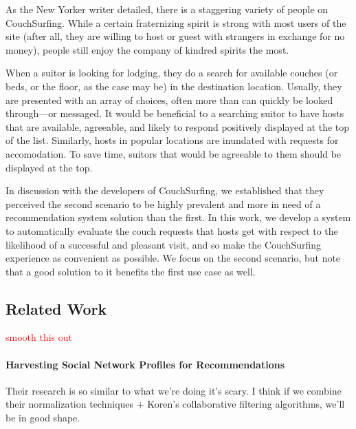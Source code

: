 \documentclass[11pt]{article}
\newcommand{\todo}[1]{\textcolor{red}{#1}}
\begin{document}
As the New Yorker writer detailed, there is a staggering variety of people on CouchSurfing.
While a certain fraternizing spirit is strong with most users of the site (after all, they are willing to host or guest with strangers in exchange for no money), people still enjoy the company of kindred spirits the most.

When a suitor is looking for lodging, they do a search for available couches (or beds, or the floor, as the case may be) in the destination location.
Usually, they are presented with an array of choices, often more than can quickly be looked through---or messaged.
It would be beneficial to a searching suitor to have hosts that are available, agreeable, and likely to respond positively displayed at the top of the list.
Similarly, hosts in popular locations are inundated with requests for accomodation.
To save time, suitors that would be agreeable to them should be displayed at the top.

In discussion with the developers of CouchSurfing, we established that they perceived the second scenario to be highly prevalent and more in need of a recommendation system solution than the first.
In this work, we develop a system to automatically evaluate the couch requests that hosts get with respect to the likelihood of a successful and pleasant visit, and so make the CouchSurfing experience as convenient as possible.
We focus on the second scenario, but note that a good solution to it benefits the first use case as well.

\subsection{Related Work}
\todo{smooth this out}

\paragraph{Harvesting Social Network Profiles for Recommendations} \cite{Liu2005}
Their research is so similar to what we're doing it's scary.
I think if we combine their normalization techniques + Koren's collaborative filtering algorithms, we'll be in good shape.
\end{document}
